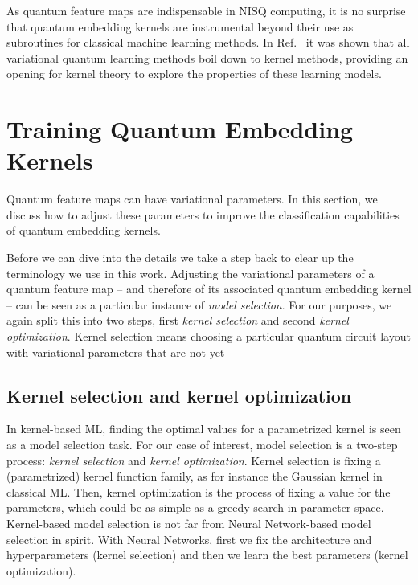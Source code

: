 \documentclass[twocolumn,superscriptaddress,nofootinbib]{revtex4-2}
\begin{document}
As quantum feature maps are indispensable in NISQ computing, it is no surprise that quantum embedding kernels are instrumental beyond their use as subroutines for classical machine learning methods. In Ref.~\cite{schuldQuantumMachineLearning2021} it was shown that all variational quantum learning methods boil down to kernel methods, providing an opening for kernel theory to explore the properties of these learning models.


\section{Training Quantum Embedding Kernels}\label{sec:training_quantum_embedding_kernels}
Quantum feature maps can have variational parameters. In this section, we discuss how to adjust these parameters to improve the classification capabilities of quantum embedding kernels.

Before we can dive into the details we take a step back to clear up the terminology we use in this work. Adjusting the variational parameters of a quantum feature map -- and therefore of its associated quantum embedding kernel -- can be seen as a particular instance of \emph{model selection}. For our purposes, we again split this into two steps, first \emph{kernel selection} and second \emph{kernel optimization}. Kernel selection means choosing a particular quantum circuit layout with variational parameters that are not yet 

\subsection{Kernel selection and kernel optimization}\label{ssec:model_selection}
    
    In kernel-based \ac{ML}, finding the optimal values for a parametrized kernel is seen as a model selection task.
    For our case of interest, model selection is a two-step process: \emph{kernel selection} and \emph{kernel optimization}.
    Kernel selection is fixing a (parametrized) kernel function family, as for instance the Gaussian kernel in classical \ac{ML}.
    Then, kernel optimization is the process of fixing a value for the parameters, which could be as simple as a greedy search in parameter space.
    Kernel-based model selection is not far from Neural Network-based model selection in spirit.
    With Neural Networks, first we fix the architecture and hyperparameters (kernel selection) and then we learn the best parameters (kernel optimization).
\end{document}
